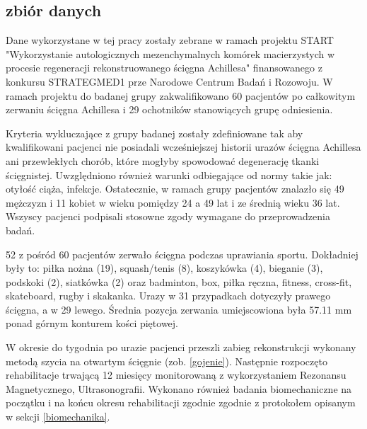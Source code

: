 \subsection{zbiór danych}

Dane wykorzystane w tej pracy zostały zebrane w ramach projektu START "Wykorzystanie autologicznych mezenchymalnych komórek macierzystych w procesie regeneracji rekonstruowanego ścięgna Achillesa" finansowanego z konkursu STRATEGMED1 prze Narodowe Centrum Badań i Rozowoju. W ramach projektu do badanej grupy zakwalifikowano 60 pacjentów po całkowitym zerwaniu ścięgna Achillesa i 29 ochotników stanowiących grupę odniesienia. 

Kryteria wykluczające z grupy badanej zostały zdefiniowane tak aby kwalifikowani pacjenci nie posiadali wcześniejszej historii urazów ścięgna Achillesa ani przewlekłych chorób, które mogłyby spowodować degenerację tkanki ścięgnistej. Uwzględniono również warunki odbiegające od normy takie jak: otyłość ciąża, infekcje. Ostatecznie, w ramach grupy pacjentów znalazło się 49 mężczyzn i 11 kobiet w wieku pomiędzy 24 a 49 lat i ze średnią wieku 36 lat. Wszyscy pacjenci podpisali stosowne zgody wymagane do przeprowadzenia badań.   

52 z pośród 60 pacjentów zerwało ścięgna podczas uprawiania sportu. Dokładniej były to: piłka nożna (19), squash/tenis (8), koszykówka (4), bieganie (3), podskoki (2), siatkówka (2) oraz badminton, box, piłka ręczna, fitness, cross-fit, skateboard, rugby i skakanka. Urazy w 31 przypadkach dotyczyły prawego ścięgna, a w 29 lewego. Średnia pozycja zerwania umiejscowiona była 57.11 mm ponad górnym konturem kości piętowej.

W okresie do tygodnia po urazie pacjenci przeszli zabieg rekonstrukcji wykonany metodą szycia na otwartym ścięgnie (zob. \ref{gojenie}). Następnie rozpoczęto rehabilitacje trwającą 12 miesięcy monitorowaną z wykorzystaniem Rezonansu Magnetycznego, Ultrasonografii. Wykonano również badania biomechaniczne na początku i na końcu okresu rehabilitacji zgodnie zgodnie z protokołem opisanym w sekcji \ref{biomechanika}.

